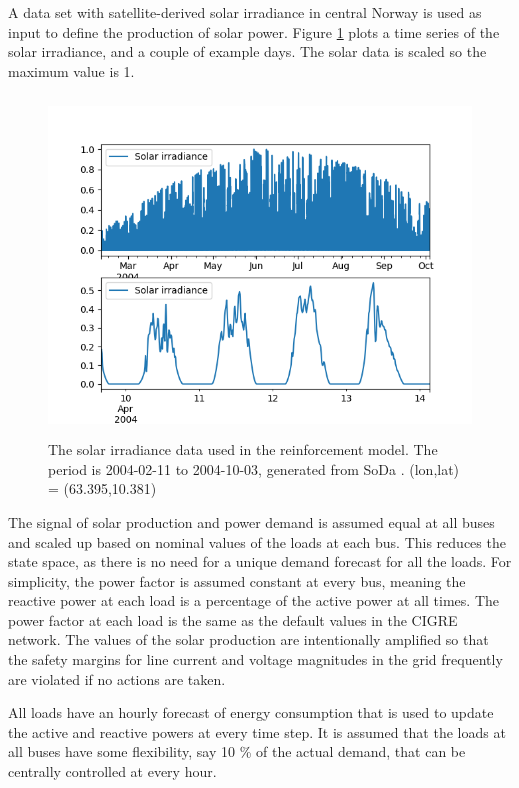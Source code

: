 \documentclass[class=book, crop=false]{standalone}
\begin{document}
A data set with satellite-derived solar irradiance in central Norway is used as input to define the production of solar power\cite{solar_data}. Figure \ref{fig:problem:solar_data} plots a time series of the solar irradiance, and a couple of example days. The solar data is scaled so the maximum value is 1.

\begin{figure}[ht]
    \includegraphics[height=9cm, width=13.5cm]{figures/solar_data.png}
    \caption[size = 9]{The solar irradiance data used in the reinforcement model. The period is 2004-02-11 to 2004-10-03, generated from SoDa \cite{solar_data}. (lon,lat) = (63.395,10.381) }
    \label{fig:problem:solar_data}
\end{figure}



The signal of solar production and power demand is assumed equal at all buses and scaled up based on nominal values of the loads at each bus. This reduces the state space, as there is no need for a unique demand forecast for all the loads.  For simplicity, the power factor is assumed constant at every bus, meaning the reactive power at each load is a percentage of the active power at all times. The power factor at each load is the same as the default values in the CIGRE network. The values of the solar production are intentionally amplified so that the safety margins for line current and voltage magnitudes in the grid frequently are violated if no actions are taken.  

All loads have an hourly forecast of energy consumption that is used to update the active and reactive powers at every time step. It is assumed that the loads at all buses have some flexibility, say 10 \% of the actual demand, that can be centrally controlled at every hour.
\end{document}
